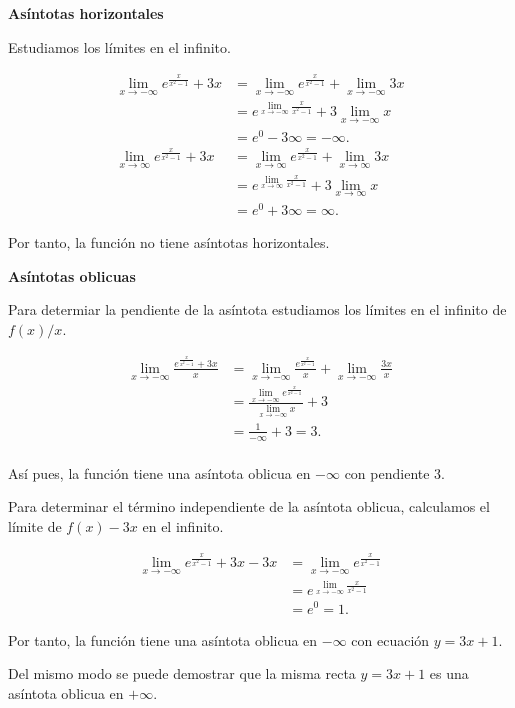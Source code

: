 \documentclass[
  a4paper,
]{scrreport}
\theoremstyle{definition}
\theoremstyle{remark}
\begin{document}
\begin{tcolorbox}
\textbf{Asíntotas horizontales}

Estudiamos los límites en el infinito.

\begin{align*}
\lim_{x\to -\infty} e^{\frac{x}{x^2-1}}+3x
&= \lim_{x\to -\infty} e^{\frac{x}{x^2-1}}+\lim_{x\to -\infty} 3x \\
&= e^{\lim_{x\to -\infty}\frac{x}{x^2-1}}+3\lim_{x\to -\infty} x \\
&= e^0-3\infty = -\infty. \\
\lim_{x\to \infty} e^{\frac{x}{x^2-1}}+3x
&= \lim_{x\to \infty} e^{\frac{x}{x^2-1}}+\lim_{x\to \infty} 3x \\ 
&= e^{\lim_{x\to \infty}\frac{x}{x^2-1}}+3\lim_{x\to \infty} x \\
&= e^0+3\infty = \infty.
\end{align*}

Por tanto, la función no tiene asíntotas horizontales.

\textbf{Asíntotas oblicuas}

Para determiar la pendiente de la asíntota estudiamos los límites en el
infinito de \(f(x)/x\).

\begin{align*}
\lim_{x\to -\infty} \frac{e^{\frac{x}{x^2-1}}+3x}{x}
&= \lim_{x\to -\infty} \frac{e^{\frac{x}{x^2-1}}}{x}+\lim_{x\to -\infty} \frac{3x}{x} \\
&= \frac{\lim_{x\to -\infty} e^{\frac{x}{x^2-1}}}{\lim_{x\to -\infty} x}+3 \\
&= \frac{1}{-\infty}+3 
= 3. \\
\end{align*}

Así pues, la función tiene una asíntota oblicua en \(-\infty\) con
pendiente \(3\).

Para determinar el término independiente de la asíntota oblicua,
calculamos el límite de \(f(x)-3x\) en el infinito.

\begin{align*}
\lim_{x\to -\infty} e^{\frac{x}{x^2-1}}+3x-3x
&= \lim_{x\to -\infty} e^{\frac{x}{x^2-1}} \\
&= e^{\lim_{x\to -\infty}\frac{x}{x^2-1}} \\
&= e^0 = 1.
\end{align*}

Por tanto, la función tiene una asíntota oblicua en \(-\infty\) con
ecuación \(y=3x+1\).

Del mismo modo se puede demostrar que la misma recta \(y=3x+1\) es una
asíntota oblicua en \(+\infty\).

\end{tcolorbox}
\end{document}
